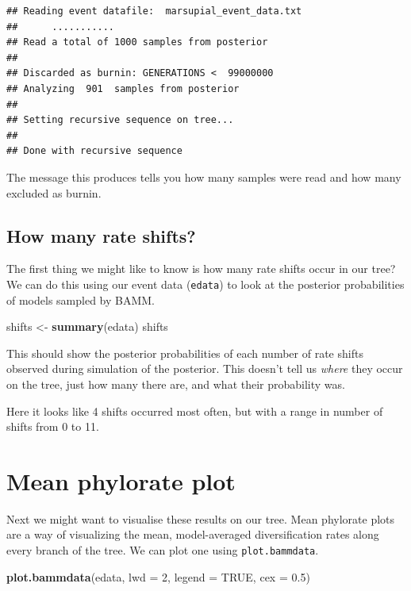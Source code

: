 \documentclass[]{book}
\newenvironment{Shaded}{\begin{snugshade}}{\end{snugshade}}
\newcommand{\KeywordTok}[1]{\textcolor[rgb]{0.13,0.29,0.53}{\textbf{{#1}}}}
\newcommand{\DataTypeTok}[1]{\textcolor[rgb]{0.13,0.29,0.53}{{#1}}}
\newcommand{\DecValTok}[1]{\textcolor[rgb]{0.00,0.00,0.81}{{#1}}}
\newcommand{\FloatTok}[1]{\textcolor[rgb]{0.00,0.00,0.81}{{#1}}}
\newcommand{\StringTok}[1]{\textcolor[rgb]{0.31,0.60,0.02}{{#1}}}
\newcommand{\OtherTok}[1]{\textcolor[rgb]{0.56,0.35,0.01}{{#1}}}
\newcommand{\NormalTok}[1]{{#1}}
\begin{document}
\begin{verbatim}
## Reading event datafile:  marsupial_event_data.txt 
##      ...........
## Read a total of 1000 samples from posterior
## 
## Discarded as burnin: GENERATIONS <  99000000
## Analyzing  901  samples from posterior
## 
## Setting recursive sequence on tree...
## 
## Done with recursive sequence
\end{verbatim}

The message this produces tells you how many samples were read and how
many excluded as burnin.

\subsection{How many rate shifts?}\label{how-many-rate-shifts}

The first thing we might like to know is how many rate shifts occur in
our tree? We can do this using our event data (\texttt{edata}) to look
at the posterior probabilities of models sampled by BAMM.

\begin{Shaded}
\begin{Highlighting}[]
\NormalTok{shifts <-}\StringTok{ }\KeywordTok{summary}\NormalTok{(edata)}
\NormalTok{shifts}
\end{Highlighting}
\end{Shaded}

This should show the posterior probabilities of each number of rate
shifts observed during simulation of the posterior. This doesn't tell us
\emph{where} they occur on the tree, just how many there are, and what
their probability was.

Here it looks like 4 shifts occurred most often, but with a range in
number of shifts from 0 to 11.

\section{Mean phylorate plot}\label{mean-phylorate-plot}

Next we might want to visualise these results on our tree. Mean
phylorate plots are a way of visualizing the mean, model-averaged
diversification rates along every branch of the tree. We can plot one
using \texttt{plot.bammdata}.

\begin{Shaded}
\begin{Highlighting}[]
\KeywordTok{plot.bammdata}\NormalTok{(edata, }\DataTypeTok{lwd =} \DecValTok{2}\NormalTok{, }\DataTypeTok{legend =} \OtherTok{TRUE}\NormalTok{, }\DataTypeTok{cex =} \FloatTok{0.5}\NormalTok{)}
\end{Highlighting}
\end{Shaded}
\end{document}
